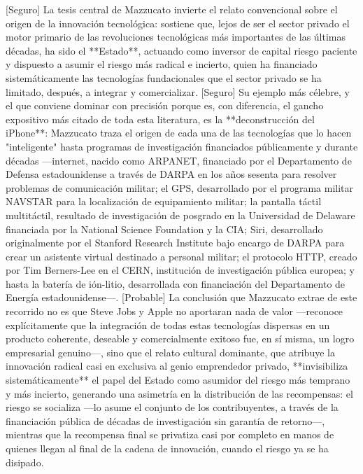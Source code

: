 \documentclass[10pt,a4paper]{article}
\begin{document}
[Seguro] La tesis central de Mazzucato invierte el relato convencional sobre el origen de la innovación tecnológica: sostiene que, lejos de ser el sector privado el motor primario de las revoluciones tecnológicas más importantes de las últimas décadas, ha sido el **Estado**, actuando como inversor de capital riesgo paciente y dispuesto a asumir el riesgo más radical e incierto, quien ha financiado sistemáticamente las tecnologías fundacionales que el sector privado se ha limitado, después, a integrar y comercializar. [Seguro] Su ejemplo más célebre, y el que conviene dominar con precisión porque es, con diferencia, el gancho expositivo más citado de toda esta literatura, es la **deconstrucción del iPhone**: Mazzucato traza el origen de cada una de las tecnologías que lo hacen "inteligente" hasta programas de investigación financiados públicamente y durante décadas —internet, nacido como ARPANET, financiado por el Departamento de Defensa estadounidense a través de DARPA en los años sesenta para resolver problemas de comunicación militar; el GPS, desarrollado por el programa militar NAVSTAR para la localización de equipamiento militar; la pantalla táctil multitáctil, resultado de investigación de posgrado en la Universidad de Delaware financiada por la National Science Foundation y la CIA; Siri, desarrollado originalmente por el Stanford Research Institute bajo encargo de DARPA para crear un asistente virtual destinado a personal militar; el protocolo HTTP, creado por Tim Berners-Lee en el CERN, institución de investigación pública europea; y hasta la batería de ión-litio, desarrollada con financiación del Departamento de Energía estadounidense—. [Probable] La conclusión que Mazzucato extrae de este recorrido no es que Steve Jobs y Apple no aportaran nada de valor —reconoce explícitamente que la integración de todas estas tecnologías dispersas en un producto coherente, deseable y comercialmente exitoso fue, en sí misma, un logro empresarial genuino—, sino que el relato cultural dominante, que atribuye la innovación radical casi en exclusiva al genio emprendedor privado, **invisibiliza sistemáticamente** el papel del Estado como asumidor del riesgo más temprano y más incierto, generando una asimetría en la distribución de las recompensas: el riesgo se socializa —lo asume el conjunto de los contribuyentes, a través de la financiación pública de décadas de investigación sin garantía de retorno—, mientras que la recompensa final se privatiza casi por completo en manos de quienes llegan al final de la cadena de innovación, cuando el riesgo ya se ha disipado.
\end{document}
